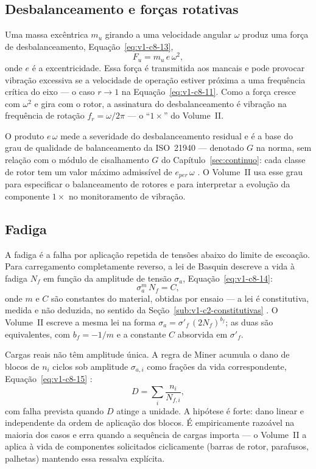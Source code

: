 \documentclass[12pt,a4paper]{article}
\numberwithin{equation}{section}
\numberwithin{table}{section}
\numberwithin{figure}{section}
\begin{document}
\subsection{Desbalanceamento e forças rotativas}\label{sub:v1-c8-desbalanceamento}

Uma massa excêntrica $m_u$ girando a uma velocidade angular $\omega$ produz
uma força de desbalanceamento, Equação~\eqref{eq:v1-c8-13},
\begin{equation}\label{eq:v1-c8-13}
F_u = m_u \, e \, \omega^2,
\end{equation}
onde $e$ é a excentricidade. Essa força é transmitida aos mancais e pode
provocar vibração excessiva se a velocidade de operação estiver próxima a uma
frequência crítica do eixo --- o caso $r \to 1$ na Equação~\eqref{eq:v1-c8-11}.
Como a força cresce com $\omega^2$ e gira com o rotor, a assinatura do
desbalanceamento é vibração na frequência de rotação $f_r = \omega/2\pi$ ---
o ``$1\times$'' do Volume~II.

O produto $e\,\omega$ mede a severidade do desbalanceamento residual e é a
base do grau de qualidade de balanceamento da ISO~21940 --- denotado $G$ na
norma, sem relação com o módulo de cisalhamento $G$ do
Capítulo~\ref{sec:continuo}: cada classe de rotor tem um valor máximo
admissível de $e_{per}\,\omega$ \cite{rao2011}. O Volume~II usa esse grau
para especificar o balanceamento de rotores e para interpretar a evolução da
componente $1\times$ no monitoramento de vibração.

\subsection{Fadiga}\label{sub:v1-c8-fadiga}

A fadiga é a falha por aplicação repetida de tensões abaixo do limite de
escoação. Para carregamento completamente reverso, a lei de Basquin descreve
a vida à fadiga $N_f$ em função da amplitude de tensão $\sigma_a$,
Equação~\eqref{eq:v1-c8-14}:
\begin{equation}\label{eq:v1-c8-14}
\sigma_a^m \, N_f = C,
\end{equation}
onde $m$ e $C$ são constantes do material, obtidas por ensaio --- a lei é
constitutiva, medida e não deduzida, no sentido da
Seção~\ref{sub:v1-c2-constitutivas} \cite{shigley2011}. O Volume~II escreve
a mesma lei na forma $\sigma_a = \sigma'_f\,(2N_f)^{b_f}$; as duas são
equivalentes, com $b_f = -1/m$ e a constante $C$ absorvida em $\sigma'_f$.

Cargas reais não têm amplitude única. A regra de Miner acumula o dano de
blocos de $n_i$ ciclos sob amplitude $\sigma_{a,i}$ como frações da vida
correspondente, Equação~\eqref{eq:v1-c8-15} \cite{shigley2011}:
\begin{equation}\label{eq:v1-c8-15}
D = \sum_i \frac{n_i}{N_{f,i}},
\end{equation}
com falha prevista quando $D$ atinge a unidade. A hipótese é forte: dano
linear e independente da ordem de aplicação dos blocos. É empiricamente
razoável na maioria dos casos e erra quando a sequência de cargas importa ---
o Volume~II a aplica à vida de componentes solicitados ciclicamente (barras
de rotor, parafusos, palhetas) mantendo essa ressalva explícita.
\end{document}
